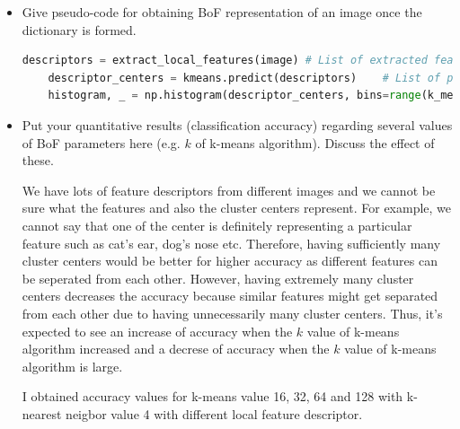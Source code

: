 \documentclass[12pt]{article}
\begin{document}
\begin{itemize}
        \item Give pseudo-code for obtaining BoF representation of an image once the dictionary is formed. 
        
	        \begin{lstlisting}[language=Python]
	descriptors = extract_local_features(image)	# List of extracted feature descriptors of an image
	descriptor_centers = kmeans.predict(descriptors)	# List of predicted centers of extracted feature descriptors
	histogram, _ = np.histogram(descriptor_centers, bins=range(k_means+1), normed=True)	# Bag of Feature representation of an image
			\end{lstlisting}
			
        \item Put your quantitative results (classification accuracy) regarding several values of BoF parameters here (e.g. $k$ of k-means algorithm). Discuss the effect of these.
        
        We have lots of feature descriptors from different images and we cannot be sure what the features and also the cluster centers represent. For example, we cannot say that one of the center is definitely representing a particular feature such as cat's ear, dog's nose etc. Therefore, having sufficiently many cluster centers would be better for higher accuracy as different features can be seperated from each other. However, having extremely many cluster centers decreases the accuracy because similar features might get separated from each other due to having unnecessarily many cluster centers. Thus, it's expected to see an increase of accuracy when the $k$ value of k-means algorithm increased and a decrese of accuracy when the $k$ value of k-means algorithm is large.
        
        I obtained accuracy values for k-means value 16, 32, 64 and 128 with k-nearest neigbor value 4 with different local feature descriptor.
        

\end{itemize}
\end{document}
